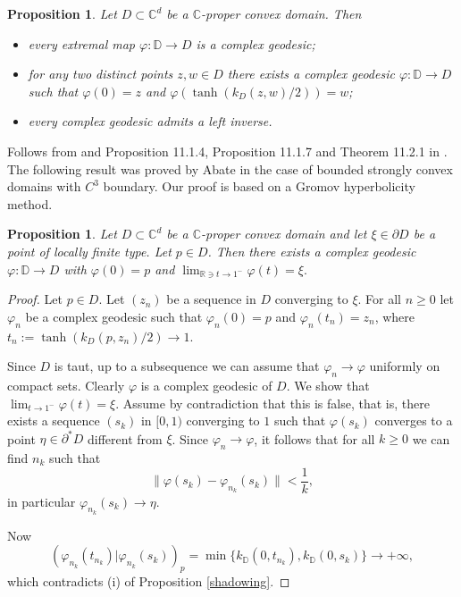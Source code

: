 \documentclass[11pt, reqno]{amsart}
\numberwithin{equation}{section}
\newtheorem{proposition}[theorem]{Proposition}
\theoremstyle{definition}
\newcommand{\C}{\mathbb{C}}
\newcommand{\D}{\mathbb{D}}
\newcommand{\R}{\mathbb{R}}
\begin{document}
	\begin{proposition}\label{extrcgeo}
		Let $D\subset \C^d$ be a $\C$-proper convex domain.
		Then 
		\begin{itemize}
			\item[(i)] every extremal map $\varphi\colon \D\to D$ is a complex geodesic;
			\item[(ii)] for any two distinct points $z,w\in D$ there exists a complex geodesic $\varphi\colon \D\to D$ such that $\varphi(0)=z$ and $\varphi(\tanh(k_D(z,w)/2))=w$; 
			\item[(iii)] every complex geodesic admits a left inverse.
		\end{itemize}
	\end{proposition} 
	\proof
	Follows from \cite{Bracci-Saracco} and Proposition 11.1.4, Proposition 11.1.7 and Theorem 11.2.1 in \cite{JarPfl}.
	\endproof
	The following result was proved by Abate \cite{Abateeglistesso} in the case of bounded strongly convex domains with $C^3$ boundary. Our proof is based on a Gromov hyperbolicity method.
	\begin{proposition}\label{convCgeo}
		Let $D\subset\C^d$ be a $\C$-proper convex domain and let $\xi\in\partial D$ be a  point of locally finite  type.
		Let $p\in D$. Then there exists a  complex geodesic $\varphi\colon \D\to D$ with $\varphi(0)=p$ and 
		$\lim_{\R\ni t\to 1^-}\varphi(t)=\xi.$
	\end{proposition}
	\begin{proof}
		
		Let $p\in D$.  Let $(z_n)$ be a sequence in $D$ converging to $\xi$.
		For all $n\geq 0$ let $\varphi_n$ be a complex geodesic such that $\varphi_n(0)=p$ and $\varphi_n(t_n)=z_n$, 
		where $t_n:=\tanh(k_D(p,z_n)/2)\to 1.$
		
		Since $D$ is taut,  up to a subsequence we can assume that $\varphi_n\to \varphi$ uniformly on compact sets. Clearly $\varphi$ is a complex geodesic of $D$.
		We   show that $\lim_{t\to1^-}\varphi(t)=\xi$. Assume by contradiction that this is false, that is,  there exists a sequence  $(s_k)$ in $[0,1)$ converging to $1$ such that $\varphi(s_k)$ converges to a point  $\eta\in \partial^* D$ different from $\xi$.
		Since $\varphi_n\to\varphi$, it follows that for all $k\geq0$ we can find $n_k$ such that
		$$\|\varphi(s_k)-\varphi_{n_k}(s_k)\|<\frac{1}{k},$$
		in particular $\varphi_{n_k}(s_k)\to\eta$. 
		
		Now$$(\varphi_{n_k}(t_{n_k})|\varphi_{n_k}(s_k))_p=\min\{k_\D(0,t_{n_k}),k_\D(0,s_k)\}\to+\infty,$$
		which contradicts (i) of Proposition \ref{shadowing}.
		
		
	\end{proof}
	
\end{document}
